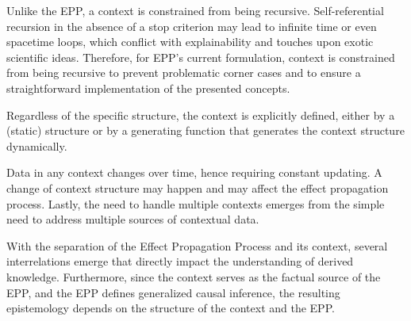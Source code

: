 Unlike the EPP, a context is constrained from being recursive. Self-referential recursion in the absence of a stop criterion may lead to infinite time or even spacetime loops, which conflict with explainability and touches upon exotic scientific ideas. Therefore, for EPP's current formulation, context is constrained from being recursive to prevent problematic corner cases and to ensure a straightforward implementation of the presented concepts.

Regardless of the specific structure, the context is explicitly defined, either by a (static) structure or by a generating function that generates the context structure dynamically.

Data in any context changes over time, hence requiring constant updating. A change of context structure may happen and may affect the effect propagation process. Lastly, the need to handle multiple contexts emerges from the simple need to address multiple sources of contextual data.

With the separation of the Effect Propagation Process and its context, several interrelations emerge that directly impact the understanding of derived knowledge. Furthermore, since the context serves as the factual source of the EPP, and the EPP defines generalized causal inference, the resulting epistemology depends on the structure of the context and the EPP.


